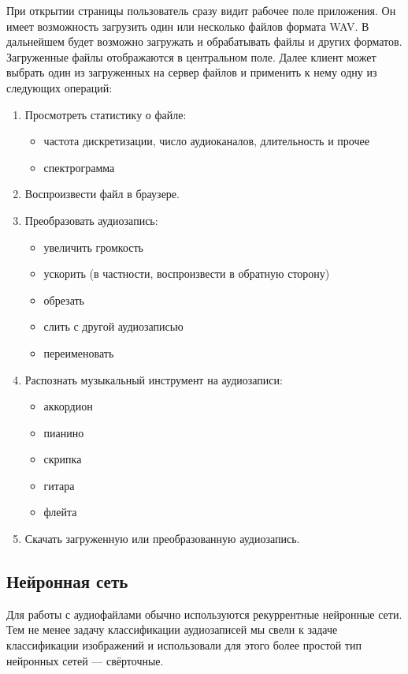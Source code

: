\documentclass[14pt,a4paper]{article}
\begin{document}
При открытии страницы пользователь сразу видит рабочее поле приложения. Он имеет возможность загрузить один или несколько файлов формата WAV. В дальнейшем будет возможно загружать и обрабатывать файлы и других форматов. Загруженные файлы отображаются в центральном поле. Далее клиент может выбрать один из загруженных на сервер файлов и применить к нему одну из следующих операций:
\begin{enumerate}
\item Просмотреть статистику о файле:
    \begin{itemize}
    \item частота дискретизации, число аудиоканалов, длительность и прочее
    \item спектрограмма
    \end{itemize}
\item Воспроизвести файл в браузере.
\item Преобразовать аудиозапись:
    \begin{itemize}
    \item увеличить громкость
    \item ускорить (в частности, воспроизвести в обратную сторону)
    \item обрезать
    \item слить с другой аудиозаписью
    \item переименовать
    \end{itemize}
\item Распознать музыкальный инструмент на аудиозаписи:
    \begin{itemize}
    \item аккордион
    \item пианино
    \item скрипка
    \item гитара
    \item флейта
    \end{itemize}
\item Скачать загруженную или преобразованную аудиозапись.
\end{enumerate}

\subsection{Нейронная сеть}

Для работы с аудиофайлами обычно используются рекуррентные нейронные сети. Тем не менее задачу классификации аудиозаписей мы свели к задаче классификации изображений и использовали для этого более простой тип нейронных сетей — свёрточные. \\
\end{document}
